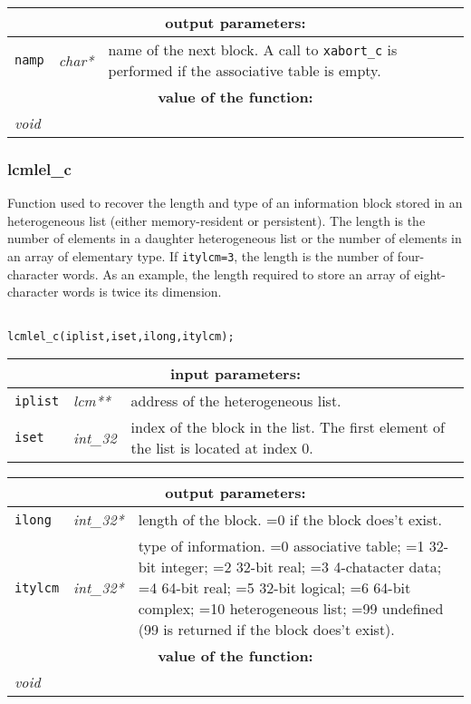\vskip 0.8cm

\noindent
\begin{tabular}{|p{1.5cm}|p{2cm}|p{11cm}|}
\hline
\multicolumn{3}{|c|}{\bf output parameters:} \\
\hline
{\tt namp} & {\it char*} & name of the next block. 
          A call to {\tt xabort\_c} is performed if the associative table is empty. \\
\hline
\multicolumn{3}{|c|}{\bf value of the function:} \\
\hline
\multicolumn{2}{|l|}{\it void} &  \\
\hline
\end{tabular}

\subsubsection{lcmlel\_c}

Function used to recover the length and type of an information block stored in an
heterogeneous list (either memory-resident or persistent). The length is the number of
elements in a daughter heterogeneous list or the number of elements in an array of elementary type.
If {\tt itylcm=3}, the length is the number of four-character words. As an example, the length required
to store an array of eight-character words is twice its dimension.

\begin{verbatim}

lcmlel_c(iplist,iset,ilong,itylcm);
\end{verbatim}

\noindent
\begin{tabular}{|p{1.5cm}|p{2cm}|p{11cm}|}
\hline
\multicolumn{3}{|c|}{\bf input parameters:} \\
\hline
{\tt iplist} & {\it lcm**} & address of the heterogeneous list. \\
\hline
{\tt iset} & {\it int\_32} & index of the block in the list.
The first element of the list is located at index $0$. \\
\hline
\end{tabular}

\vskip 0.8cm

\noindent
\begin{tabular}{|p{1.5cm}|p{2cm}|p{11cm}|}
\hline
\multicolumn{3}{|c|}{\bf output parameters:} \\
\hline
{\tt ilong} & {\it int\_32*} & length of the block. =0 if the block does't exist. \\
\hline
{\tt itylcm} & {\it int\_32*} & type of information. =0 associative table; =1 32-bit integer; 
                                    =2 32-bit real; =3 4-chatacter data; 
				    =4 64-bit real; =5 32-bit logical; =6 64-bit complex; =10 heterogeneous list; 
				    =99 undefined (99 is returned if the block does't exist).  \\
\hline
\multicolumn{3}{|c|}{\bf value of the function:} \\
\hline
\multicolumn{2}{|l|}{\it void} &  \\
\hline
\end{tabular}

